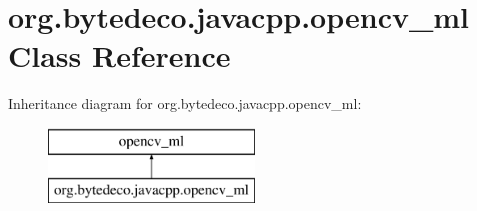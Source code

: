\hypertarget{classorg_1_1bytedeco_1_1javacpp_1_1opencv__ml}{}\section{org.\+bytedeco.\+javacpp.\+opencv\+\_\+ml Class Reference}
\label{classorg_1_1bytedeco_1_1javacpp_1_1opencv__ml}
Inheritance diagram for org.\+bytedeco.\+javacpp.\+opencv\+\_\+ml\+:\begin{figure}[H]
\begin{center}
\leavevmode
\includegraphics[height=2.000000cm]{classorg_1_1bytedeco_1_1javacpp_1_1opencv__ml}
\end{center}
\end{figure}
